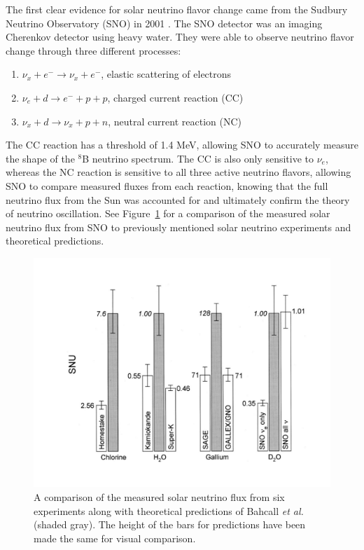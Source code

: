 The first clear evidence for solar neutrino flavor change came from the Sudbury Neutrino Observatory (SNO) in 2001 \cite{SNO,SNOOsc}. 
The SNO detector was an imaging Cherenkov detector using heavy water.
They were able to observe neutrino flavor change through three different processes:
 \renewcommand{\labelenumi}{(\roman{enumi})}
\begin{enumerate}
	\centering
	\item  ${\nu_x + {e^-} \rightarrow \nu_x + {e^-}}$, elastic scattering of electrons
	\item $\nu_e + d \rightarrow {e^-} + p + p$, charged current reaction (CC)
	\item $\nu_x + d \rightarrow \nu_x + p+ n$, neutral current reaction (NC)
\end{enumerate}
The CC reaction has a threshold of 1.4 MeV, allowing SNO to accurately measure the shape of the $^{8}$B neutrino spectrum.
The CC is also only sensitive to $\nu_{e}$, whereas the NC reaction is sensitive to all three active neutrino flavors, allowing SNO to compare measured fluxes from each reaction, knowing that the full neutrino flux from the Sun was accounted for
 and ultimately confirm the theory of neutrino oscillation.
See Figure~\ref{fig:expsolarflux} for a comparison of the measured solar neutrino flux from SNO to previously mentioned solar neutrino experiments and theoretical predictions.

\begin{figure}[t!]
	\centering
	\includegraphics[width=0.6\linewidth]{tex/2-neutrinos-images/ExpSolarFlux}
	\caption{A comparison of the measured solar neutrino flux from six experiments along with theoretical predictions of Bahcall \textit{et al.} \cite{Bahcall:2000nu} (shaded gray). The height of the bars for predictions have been made the same for visual comparison. \cite{RevModPhys.75.985}}
	\label{fig:expsolarflux}
\end{figure}


